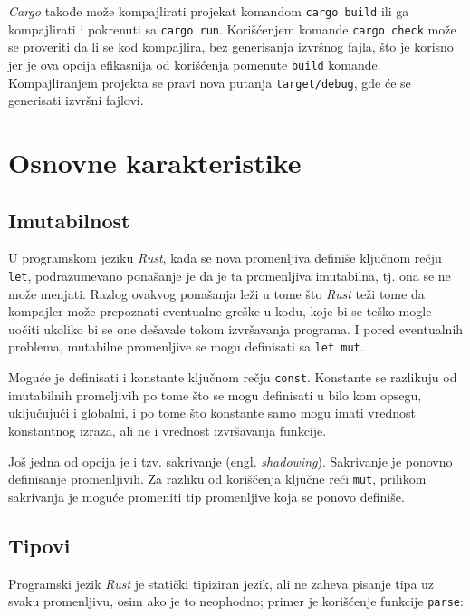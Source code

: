 \documentclass[12pt,oneside]{memoir}
\begin{document}


\emph{Cargo} takođe može kompajlirati projekat komandom 
\texttt{cargo build} ili ga kompajlirati i pokrenuti sa 
\texttt{cargo run}. Korišćenjem komande \texttt{cargo check} 
može se proveriti da li se kod kompajlira, bez generisanja 
izvršnog fajla, što je korisno jer je ova opcija efikasnija 
od korišćenja pomenute \texttt{build} komande. Kompajliranjem 
projekta se pravi nova putanja \texttt{target/debug}, gde će se 
generisati izvršni fajlovi.

\section{Osnovne karakteristike}

\subsection{Imutabilnost}
U programskom jeziku \emph{Rust}, kada se nova promenljiva definiše 
ključnom rečju \texttt{let}, podrazumevano ponašanje je da je ta 
promenljiva imutabilna, tj. ona se ne može menjati. Razlog ovakvog 
ponašanja leži u tome što \emph{Rust} teži tome da kompajler može 
prepoznati eventualne greške u kodu, koje bi se teško mogle uočiti 
ukoliko bi se one dešavale tokom izvršavanja programa. I pored 
eventualnih problema, mutabilne promenljive se mogu definisati 
sa \texttt{let mut}.

Moguće je definisati i konstante ključnom rečju \texttt{const}. 
Konstante se razlikuju od imutabilnih promeljivih po tome što se 
mogu definisati u bilo kom opsegu, uključujući i globalni, i po 
tome što konstante samo mogu imati vrednost konstantnog izraza, 
ali ne i vrednost izvršavanja funkcije.

Još jedna od opcija je i tzv. sakrivanje (engl. \emph{shadowing}). 
Sakrivanje je ponovno definisanje promenljivih. Za razliku od
korišćenja ključne reči \texttt{mut}, prilikom sakrivanja je
moguće promeniti tip promenljive koja se ponovo definiše.

\subsection{Tipovi}
Programski jezik \emph{Rust} je statički tipiziran jezik, ali
ne zaheva pisanje tipa uz svaku promenljivu, osim ako je to
neophodno; primer je korišćenje funkcije \texttt{parse}:


\end{document}
